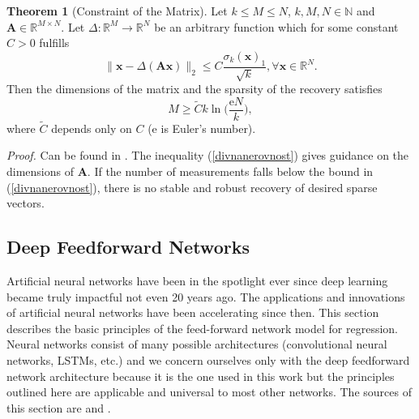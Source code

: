 \documentclass[11pt,oneside,czech,american]{book} %
\theoremstyle{definition} %
\newtheorem{thm}{Theorem}
\theoremstyle{definition}
\begin{document}
\begin{thm}[Constraint of the Matrix]
	Let $k \leq M \leq N$, $k,M,N \in \mathbb{N}$ and $\bm{A} \in \mathbb{R}^{M \times N}$. Let $\Delta: \mathbb{R}^M \rightarrow \mathbb{R}^N$ be an arbitrary function which for some constant $C>0$ fulfills
	\begin{equation}
		\lVert \bm{x} - \Delta(\bm{Ax}) \rVert_2 \leq C \frac{\sigma_k(\bm{x})_1}{\sqrt{k}}, \forall \bm{x} \in \mathbb{R}^N.
	\end{equation}
Then the dimensions of the matrix and the sparsity of the recovery satisfies
\begin{equation}
	M \geq \tilde{C}k \ln\Bigg(\frac{\text{e}N}{k}\Bigg),
	\label{divnanerovnost}
\end{equation}
where $\tilde{C}$ depends only on $C$ ($\text{e}$ is Euler's number).
\end{thm}
\emph{Proof.} Can be found in \parencite{boche15}.
\newline
\newline
The inequality (\ref{divnanerovnost}) gives guidance on the dimensions of $\bm{A}$. If the number of measurements falls below the bound in (\ref{divnanerovnost}), there is no stable and robust recovery of desired sparse vectors.

\subsection{Deep Feedforward Networks}
Artificial neural networks have been in the spotlight ever since deep learning became truly impactful not even 20 years ago. The applications and innovations of artificial neural networks have been accelerating since then.
This section describes the basic principles of the feed-forward network model for regression. Neural networks consist of many possible architectures (convolutional neural networks, LSTMs, etc.) and we concern ourselves only with the deep feedforward network architecture because it is the one used in this work but the principles outlined here are applicable and universal to most other networks. The sources of this section are \parencite{goodfellow16} and \parencite{tensorflow15}.
\end{document}
